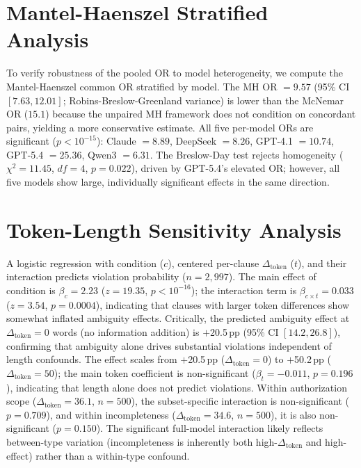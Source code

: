 \section{Mantel-Haenszel Stratified Analysis}
\label{app:mantel_haenszel}

To verify robustness of the pooled OR to model heterogeneity, we compute the Mantel-Haenszel common OR stratified by model. The MH OR $= 9.57$ (95\% CI $[7.63, 12.01]$; Robins-Breslow-Greenland variance) is lower than the McNemar OR ($15.1$) because the unpaired MH framework does not condition on concordant pairs, yielding a more conservative estimate. All five per-model ORs are significant ($p < 10^{-15}$): Claude $= 8.89$, DeepSeek $= 8.26$, GPT-4.1 $= 10.74$, GPT-5.4 $= 25.36$, Qwen3 $= 6.31$. The Breslow-Day test rejects homogeneity ($\chi^2 = 11.45$, $df = 4$, $p = 0.022$), driven by GPT-5.4's elevated OR; however, all five models show large, individually significant effects in the same direction.

\section{Token-Length Sensitivity Analysis}
\label{app:token_sensitivity}

A logistic regression with condition ($c$), centered per-clause $\Delta_{\text{token}}$ ($t$), and their interaction predicts violation probability ($n = 2{,}997$). The main effect of condition is $\beta_c = 2.23$ ($z = 19.35$, $p < 10^{-16}$); the interaction term is $\beta_{c \times t} = 0.033$ ($z = 3.54$, $p = 0.0004$), indicating that clauses with larger token differences show somewhat inflated ambiguity effects. Critically, the predicted ambiguity effect at $\Delta_{\text{token}} = 0$ words (no information addition) is $+$20.5\,pp (95\% CI $[14.2, 26.8]$), confirming that ambiguity alone drives substantial violations independent of length confounds. The effect scales from $+$20.5\,pp ($\Delta_{\text{token}} = 0$) to $+$50.2\,pp ($\Delta_{\text{token}} = 50$); the main token coefficient is non-significant ($\beta_t = -0.011$, $p = 0.196$), indicating that length alone does not predict violations. Within authorization scope ($\Delta_{\text{token}} = 36.1$, $n = 500$), the subset-specific interaction is non-significant ($p = 0.709$), and within incompleteness ($\Delta_{\text{token}} = 34.6$, $n = 500$), it is also non-significant ($p = 0.150$). The significant full-model interaction likely reflects between-type variation (incompleteness is inherently both high-$\Delta_{\text{token}}$ and high-effect) rather than a within-type confound.


